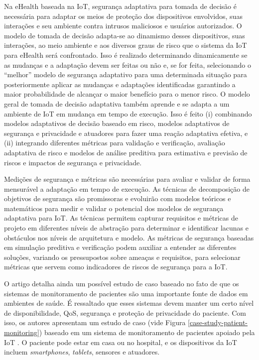 \documentclass[tid,table]{texufpel} %
\begin{document}
Na eHealth baseada na IoT, segurança adaptativa para tomada de decisão é necessária para adaptar os meios de proteção dos dispositivos envolvidos, suas interações e seu ambiente contra intrusos maliciosos e usuários autorizados. O modelo de tomada de decisão adapta-se ao dinamismo desses dispositivos, suas interações, ao meio ambiente e aos diversos graus de risco que o sistema da IoT para eHealth será confrontado. Isso é realizado determinando dinamicamente se as mudanças e a adaptação devem ser feitas ou não e, se for feita, selecionando o ``melhor'' modelo de segurança adaptativo para uma determinada situação para posteriormente aplicar as mudanças e adaptações identificadas garantindo a maior probabilidade de alcançar o maior benefício para o menor risco. O modelo geral de tomada de decisão adaptativa também aprende e se adapta a um ambiente de IoT em mudança em tempo de execução. Isso é feito (i) combinando modelos adaptativos de decisão baseado em risco, modelos adaptativos de segurança e privacidade e atuadores para fazer uma reação adaptativa efetiva, e (ii) integrando diferentes métricas para validação e verificação, avaliação adaptativa de risco e modelos de análise preditiva para estimativa e previsão de riscos e impactos de segurança e privacidade.


Medições de segurança e métricas são necessárias para avaliar e validar de forma mensurável a adaptação em tempo de execução. As técnicas de decomposição de objetivos de segurança são promissoras e evoluirão com modelos teóricos e matemáticos para medir e validar o potencial dos modelos de segurança adaptativa para IoT. As técnicas permitem capturar requisitos e métricas de projeto em diferentes níveis de abstração para determinar e identificar lacunas e obstáculos nos níveis de arquitetura e modelo. As métricas de segurança baseadas em simulação preditiva e verificação podem auxiliar a entender as diferentes soluções, variando os pressupostos sobre ameaças e requisitos, para selecionar métricas que servem como indicadores de riscos de segurança para a IoT.


O artigo detalha ainda um possível estudo de caso baseado no fato de que os sistemas de monitoramento de pacientes são uma importante fonte de dados em ambientes de saúde. É ressaltado que esses sistemas devem manter um certo nível de disponibilidade, QoS, segurança e proteção de privacidade do paciente. Com isso, os autores apresentam um estudo de caso (vide Figura \ref{case-study-patient-monitoring}) baseado em um sistema de monitoramento de pacientes apoiado pela IoT . O paciente pode estar em casa ou no hospital, e os dispositivos da IoT incluem \textit{smartphones}, \textit{tablets}, sensores e atuadores.
\end{document}
